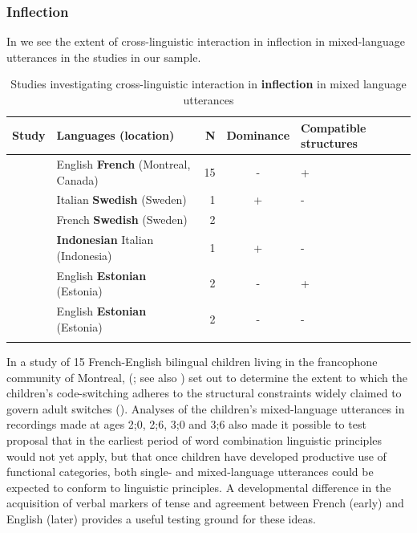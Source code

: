 \documentclass[output=paper]{langscibook}
\begin{document}
\subsubsection{Inflection}

In  we see the extent of cross-linguistic interaction in inflection in mixed-language utterances in the studies in our sample.

\begin{table}
\begin{tabularx}{\textwidth}{QQrcp{1.8cm}}
\lsptoprule
{ Study} & { Languages} { (location)} & { N} & {{ Dominance}} & { Compatible structures}\\
\midrule
\citet{ParadisEtAl2000} & English \textbf{French} (Montreal, Canada) & 15 & - & { +}\\
\tablevspace
 \citet{BernardiniSchlyter2004} & Italian \textbf{Swedish} (Sweden) & 1 & { +}  & -\\
& French \textbf{Swedish} (Sweden) & 2 &  &   \\
\tablevspace
 \citet{Soriente2014} & \textbf{Indonesian} Italian (Indonesia) & 1 & { +} & -\\
\tablevspace
 \citet{Vihman2016} & English \textbf{Estonian} (Estonia) & 2 & { -}
& +\\
\tablevspace
 \citet{Vihman2018} & English \textbf{Estonian} (Estonia) & 2 & { -}
& -\\
\lspbottomrule
\end{tabularx}
\caption{Studies investigating cross-linguistic interaction in \textbf{inflection} in mixed language utterances}
\label{tab:vihmannvihmann:10}
\end{table}

In a study of 15 French-English bilingual children living in the francophone community of Montreal, \citeauthor{ParadisEtAl2000} (\citeyear{ParadisEtAl2000}; see also \citealt{ParadisGenesee1996}) set out to determine the extent to which the children’s code-switching adheres to the structural constraints widely claimed to govern adult switches (\citealt{Myers-Scotton1993duelling}). Analyses of the children’s mixed-language utterances in recordings made at ages 2;0, 2;6, 3;0 and 3;6 also made it possible to test  proposal that in the earliest period of word combination linguistic principles would not yet apply, but that once children have developed productive use of functional categories, both single- and mixed-language utterances could be expected to conform to linguistic principles. A developmental difference in the acquisition of verbal markers of tense and agreement between French (early) and English (later) provides a useful testing ground for these ideas.
\end{document}
